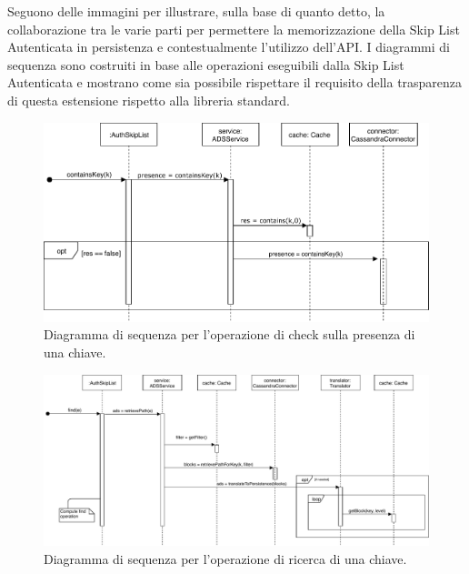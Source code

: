 

	Seguono delle immagini per illustrare, sulla base di quanto detto, la collaborazione tra le varie parti per permettere la memorizzazione della Skip List Autenticata in persistenza e contestualmente l'utilizzo dell'API. I diagrammi di sequenza sono costruiti in base alle operazioni eseguibili dalla Skip List Autenticata e mostrano come sia possibile rispettare il requisito della trasparenza di questa estensione rispetto alla libreria standard.

	\begin{figure}
		\centering
		\includegraphics[scale=0.6]{figure/containsKeySD.pdf}
		\caption{Diagramma di sequenza per l'operazione di check sulla presenza di una chiave.}\label{fig:containsKeySD}
	\end{figure}

	\begin{figure}
		\centering
		\includegraphics[scale=0.6]{figure/findSD.pdf}
		\caption{Diagramma di sequenza per l'operazione di ricerca di una chiave.}\label{fig:findSD}
	\end{figure}

